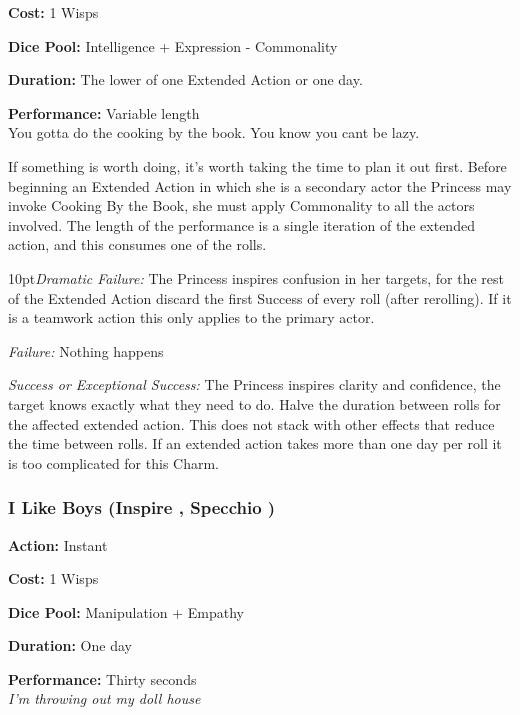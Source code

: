 \noindent \textbf{Cost:} 1 Wisps

\noindent \textbf{Dice Pool:} Intelligence + Expression - Commonality

\noindent \textbf{Duration:} The lower of one Extended Action or one day.

\noindent \textbf{Performance:} Variable length\\

\noindent You gotta do the cooking by the book. You know you cant be lazy.

If something is worth doing, it's worth taking the time to plan it out first. Before beginning an Extended Action in which she is a secondary actor the Princess may invoke Cooking By the Book, she must apply Commonality to all the actors involved. The length of the performance is a single iteration of the extended action, and this consumes one of the rolls. 

\begin{myindentpar}{10pt}\emph{Dramatic Failure:} The Princess inspires confusion in her targets, for the rest of the Extended Action discard the first Success of every roll (after rerolling). If it is a teamwork action this only applies to the primary actor. 
 
 \emph{Failure:} Nothing happens
 
 \emph{Success or Exceptional Success:} The Princess inspires clarity and confidence, the target knows exactly what they need to do. Halve the duration between rolls for the affected extended action. This does not stack with other effects that reduce the time between rolls. If an extended action takes more than one day per roll it is too complicated for this Charm.
 \end{myindentpar}

 \subsubsection*{I Like Boys (Inspire \textbullet, Specchio \textbullet)}

\noindent \textbf{Action:} Instant

\noindent \textbf{Cost:} 1 Wisps

\noindent \textbf{Dice Pool:} Manipulation + Empathy

\noindent \textbf{Duration:} One day

\noindent \textbf{Performance:} Thirty seconds \\

\noindent \textit{I'm throwing out my doll house}

